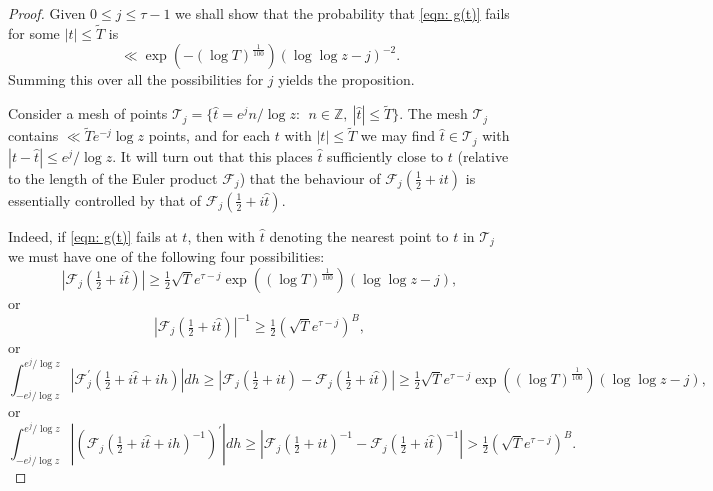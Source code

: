 \documentclass[12pt, notitlepage]{amsart}
\numberwithin{equation}{section}
\def\TT{\widetilde{T}}
\theoremstyle{remark}
\theoremstyle{definition}
\theoremstyle{remark}
\numberwithin{equation}{section}
\begin{document}
\begin{proof}   Given $0\le j\le \tau -1$  we shall show that the probability that \eqref{eqn: g(t)} fails for some $|t| \le \TT$ is  
$$ 
\ll \exp(-(\log T)^{\frac 1{100}}) (\log \log z -j)^{-2}.  
$$
Summing this over all the possibilities for $j$ yields the proposition.  

Consider a mesh of points ${\mathcal T}_j = \{ {\widehat t} = e^{j} n/\log z :\ \ n\in {\mathbb Z}, \ |{\widehat t}| \le \TT\}$.  The mesh ${\mathcal T}_j$ contains $\ll \TT e^{-j} \log z$ points, and for each $t$ with $|t|\le \TT$ we may find ${\widehat t} \in {\mathcal T}_j$ with $|t-{\widehat t}| \le e^{j}/\log z$. It will turn out that this places ${\widehat t}$ sufficiently close to $t$ (relative to the length of the Euler product ${\mathcal F}_{j}$) that the behaviour of ${\mathcal F}_j(\tfrac 12 +it)$ is essentially controlled by that of ${\mathcal F}_j(\tfrac 12 +i{\widehat t})$.

Indeed, if \eqref{eqn: g(t)} fails at $t$, then with ${\widehat t}$ denoting the nearest point to $t$ in ${\mathcal T}_j$ we must have one of the following four possibilities: 
\begin{equation} 
\label{3.8} 
|{\mathcal F}_j(\tfrac 12 +i{\widehat t})| \ge \tfrac 12 \sqrt{T} e^{\tau-j} \exp((\log T)^{\frac 1{100}}) (\log \log z - j), 
\end{equation} 
or 
\begin{equation} 
\label{3.9} |{\mathcal F}_j(\tfrac 12 + i{\widehat t})|^{-1} \ge \tfrac 12 (\sqrt{T} e^{\tau-j})^B, 
\end{equation} 
or 
\begin{equation} 
\label{3.10} 
\int_{-e^{j}/\log z}^{e^{j}/\log z} |{\mathcal F}_j^{\prime}(\tfrac 12+i{\widehat t} +ih)| dh 
\ge |{\mathcal F}_j(\tfrac 12+it)-{\mathcal F}_j(\tfrac 12+i{\widehat t})| \ge \tfrac 12 \sqrt{T} e^{\tau-j} \exp((\log T)^{\frac 1{100}}) (\log \log z - j), 
\end{equation}
or 
\begin{equation} 
\label{3.11} 
\int_{-e^{j}/\log z}^{e^{j}/\log z} |({\mathcal F}_j(\tfrac 12+i{\widehat t} +ih)^{-1})^{\prime}| dh 
\ge  |{\mathcal F}_j(\tfrac 12+it)^{-1} - {\mathcal F}_j(\tfrac 12 +i{\widehat t})^{-1} |  > \tfrac 12  (\sqrt{T}e^{\tau-j})^{B}. 
\end{equation} 


\end{proof}
\end{document}
